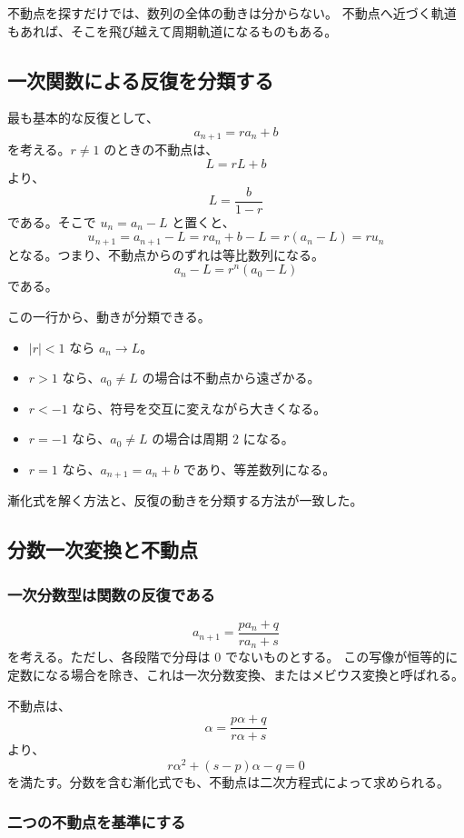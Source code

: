 不動点を探すだけでは、数列の全体の動きは分からない。
不動点へ近づく軌道もあれば、そこを飛び越えて周期軌道になるものもある。

\subsection{一次関数による反復を分類する}

最も基本的な反復として、
\[
  a_{n+1}=ra_n+b
\]
を考える。$r\neq1$ のときの不動点は、
\[
  L=rL+b
\]
より、
\[
  L=\frac{b}{1-r}
\]
である。そこで $u_n=a_n-L$ と置くと、
\[
  u_{n+1}=a_{n+1}-L
  =ra_n+b-L
  =r(a_n-L)=ru_n
\]
となる。つまり、不動点からのずれは等比数列になる。
\[
  a_n-L=r^n(a_0-L)
\]
である。

この一行から、動きが分類できる。

\begin{itemize}
  \item $|r|<1$ なら $a_n\to L$。
  \item $r>1$ なら、$a_0\neq L$ の場合は不動点から遠ざかる。
  \item $r<-1$ なら、符号を交互に変えながら大きくなる。
  \item $r=-1$ なら、$a_0\neq L$ の場合は周期 $2$ になる。
  \item $r=1$ なら、$a_{n+1}=a_n+b$ であり、等差数列になる。
\end{itemize}

漸化式を解く方法と、反復の動きを分類する方法が一致した。

\subsection{分数一次変換と不動点}

\subsubsection{一次分数型は関数の反復である}

\[
  a_{n+1}=\frac{pa_n+q}{ra_n+s}
\]
を考える。ただし、各段階で分母は $0$ でないものとする。
この写像が恒等的に定数になる場合を除き、これは一次分数変換、またはメビウス変換と呼ばれる。

不動点は、
\[
  \alpha=\frac{p\alpha+q}{r\alpha+s}
\]
より、
\[
  r\alpha^2+(s-p)\alpha-q=0
\]
を満たす。分数を含む漸化式でも、不動点は二次方程式によって求められる。

\subsubsection{二つの不動点を基準にする}

